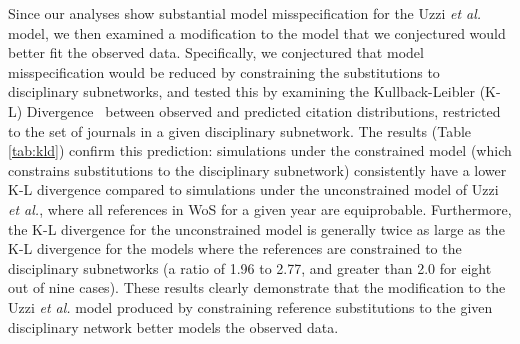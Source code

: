 \documentclass[NETN]{stjour}
\begin{document}
Since our analyses show substantial model misspecification for the Uzzi {\em et al.} model, we then examined a modification to the model that we conjectured would better fit the observed data.  Specifically, 
we conjectured that model misspecification would be reduced by constraining the substitutions to  disciplinary subnetworks,  and tested this by examining the Kullback-Leibler (K-L) Divergence~\citep{kullback_information_1951} between observed and predicted citation distributions,
restricted to  the set of journals in a given disciplinary subnetwork.  
The results (Table \ref{tab:kld}) confirm this prediction: simulations under the constrained model (which constrains substitutions to the
disciplinary subnetwork) consistently have a lower K-L divergence compared to simulations under the unconstrained model of Uzzi {\em et al.},  where all references in WoS for a given year are equiprobable.
Furthermore, the K-L divergence for  the unconstrained model is generally twice as large as the K-L divergence for the models where the references are constrained to  the disciplinary subnetworks (a ratio of 1.96 to 2.77,  and  greater than 2.0 for eight out of nine cases).
These results clearly demonstrate that the modification to the Uzzi {\em et al.} model produced by  constraining reference substitutions to the given disciplinary network better models the observed data.
\end{document}
